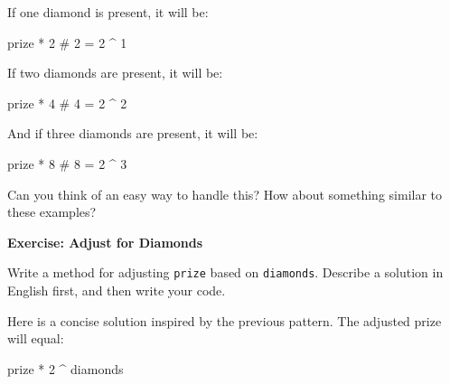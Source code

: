 \documentclass[
  letterpaper,
  DIV=11,
  numbers=noendperiod]{scrbook}
\newenvironment{Shaded}{\begin{snugshade}}{\end{snugshade}}
\newcommand{\CommentTok}[1]{\textcolor[rgb]{0.37,0.37,0.37}{#1}}
\newcommand{\DecValTok}[1]{\textcolor[rgb]{0.68,0.00,0.00}{#1}}
\newcommand{\NormalTok}[1]{\textcolor[rgb]{0.00,0.23,0.31}{#1}}
\newcommand{\SpecialCharTok}[1]{\textcolor[rgb]{0.37,0.37,0.37}{#1}}
\begin{document}
If one diamond is present, it will be:

\begin{Shaded}
\begin{Highlighting}[]
\NormalTok{prize }\SpecialCharTok{*} \DecValTok{2}      \CommentTok{\# 2 = 2 \^{} 1}
\end{Highlighting}
\end{Shaded}

If two diamonds are present, it will be:

\begin{Shaded}
\begin{Highlighting}[]
\NormalTok{prize }\SpecialCharTok{*} \DecValTok{4}      \CommentTok{\# 4 = 2 \^{} 2}
\end{Highlighting}
\end{Shaded}

And if three diamonds are present, it will be:

\begin{Shaded}
\begin{Highlighting}[]
\NormalTok{prize }\SpecialCharTok{*} \DecValTok{8}      \CommentTok{\# 8 = 2 \^{} 3}
\end{Highlighting}
\end{Shaded}

Can you think of an easy way to handle this? How about something similar
to these examples?

\begin{tcolorbox}[enhanced jigsaw, left=2mm, breakable, colback=white, colframe=quarto-callout-color-frame, leftrule=.75mm, bottomrule=.15mm, arc=.35mm, opacityback=0, rightrule=.15mm, toprule=.15mm]

\vspace{-3mm}\textbf{Exercise: Adjust for Diamonds}\vspace{3mm}

Write a method for adjusting \texttt{prize} based on \texttt{diamonds}.
Describe a solution in English first, and then write your code.

\end{tcolorbox}

Here is a concise solution inspired by the previous pattern. The
adjusted prize will equal:

\begin{Shaded}
\begin{Highlighting}[]
\NormalTok{prize }\SpecialCharTok{*} \DecValTok{2} \SpecialCharTok{\^{}}\NormalTok{ diamonds}
\end{Highlighting}
\end{Shaded}
\end{document}
